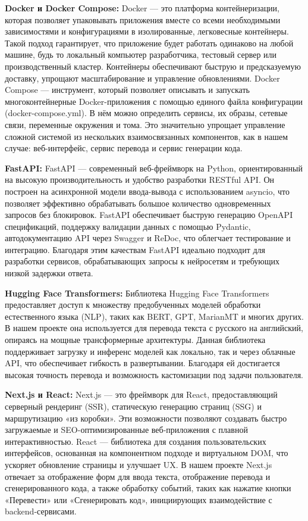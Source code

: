 \textbf{Docker и Docker Compose:}  
Docker — это платформа контейнеризации, которая позволяет упаковывать приложения вместе со всеми необходимыми зависимостями и конфигурациями в изолированные, легковесные контейнеры. Такой подход гарантирует, что приложение будет работать одинаково на любой машине, будь то локальный компьютер разработчика, тестовый сервер или производственный кластер. Контейнеры обеспечивают быструю и предсказуемую доставку, упрощают масштабирование и управление обновлениями.  
Docker Compose — инструмент, который позволяет описывать и запускать многоконтейнерные Docker-приложения с помощью единого файла конфигурации (docker-compose.yml). В нём можно определить сервисы, их образы, сетевые связи, переменные окружения и тома. Это значительно упрощает управление сложной системой из нескольких взаимосвязанных компонентов, как в нашем случае: веб-интерфейс, сервис перевода и сервис генерации кода.

\textbf{FastAPI:}  
FastAPI — современный веб-фреймворк на Python, ориентированный на высокую производительность и удобство разработки RESTful API. Он построен на асинхронной модели ввода-вывода с использованием asyncio, что позволяет эффективно обрабатывать большое количество одновременных запросов без блокировок.  
FastAPI обеспечивает быструю генерацию OpenAPI спецификаций, поддержку валидации данных с помощью Pydantic, автодокументацию API через Swagger и ReDoc, что облегчает тестирование и интеграцию. Благодаря этим качествам FastAPI идеально подходит для разработки сервисов, обрабатывающих запросы к нейросетям и требующих низкой задержки ответа.

\textbf{Hugging Face Transformers:}  
Библиотека Hugging Face Transformers предоставляет доступ к множеству предобученных моделей обработки естественного языка (NLP), таких как BERT, GPT, MarianMT и многих других. В нашем проекте она используется для перевода текста с русского на английский, опираясь на мощные трансформерные архитектуры.  
Данная библиотека поддерживает загрузку и инференс моделей как локально, так и через облачные API, что обеспечивает гибкость в развертывании. Благодаря ей достигается высокая точность перевода и возможность кастомизации под задачи пользователя.

\textbf{Next.js и React:}  
Next.js — это фреймворк для React, предоставляющий серверный рендеринг (SSR), статическую генерацию страниц (SSG) и маршрутизацию «из коробки». Эти возможности позволяют создавать быстро загружаемые и SEO-оптимизированные веб-приложения с плавной интерактивностью.  
React — библиотека для создания пользовательских интерфейсов, основанная на компонентном подходе и виртуальном DOM, что ускоряет обновление страницы и улучшает UX.  
В нашем проекте Next.js отвечает за отображение форм для ввода текста, отображение перевода и сгенерированного кода, а также обработку событий, таких как нажатие кнопки «Перевести» или «Сгенерировать код», инициирующих взаимодействие с backend-сервисами.

